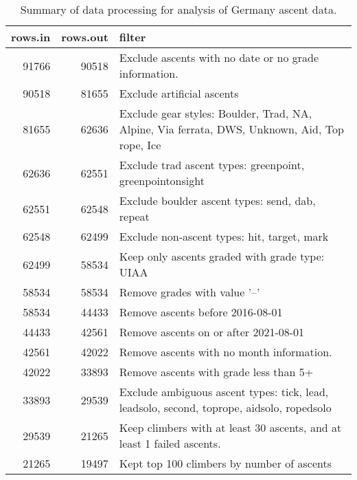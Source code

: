 \begin{table}[ht]
\centering
\begingroup\fontsize{9pt}{10pt}\selectfont
\begin{tabular}{rrl}
  \hline
{\bf rows.in} & {\bf rows.out} & {\bf filter} \\ 
  \hline
91766 & 90518 & Exclude ascents with no date or no grade information. \\ 
  90518 & 81655 & Exclude artificial ascents \\ 
  81655 & 62636 & Exclude gear styles: Boulder, Trad, NA, Alpine, Via ferrata, DWS, Unknown, Aid, Top rope, Ice \\ 
  62636 & 62551 & Exclude trad ascent types: greenpoint, greenpointonsight \\ 
  62551 & 62548 & Exclude boulder ascent types: send, dab, repeat \\ 
  62548 & 62499 & Exclude non-ascent types: hit, target, mark \\ 
  62499 & 58534 & Keep only ascents graded with grade type: UIAA \\ 
  58534 & 58534 & Remove grades with value '--' \\ 
  58534 & 44433 & Remove ascents before 2016-08-01 \\ 
  44433 & 42561 & Remove ascents on or after 2021-08-01 \\ 
  42561 & 42022 & Remove ascents with no month information. \\ 
  42022 & 33893 & Remove ascents with grade less than 5+ \\ 
  33893 & 29539 & Exclude ambiguous ascent types: tick, lead, leadsolo, second, toprope, aidsolo, ropedsolo \\ 
  29539 & 21265 & Keep climbers with at least 30 ascents, and at least 1 failed ascents. \\ 
  21265 & 19497 & Kept top 100 climbers by number of ascents \\ 
   \hline
\end{tabular}
\endgroup
\caption{Summary of data processing for analysis of Germany ascent data.} 
\label{table-data-processing-germany}
\end{table}
